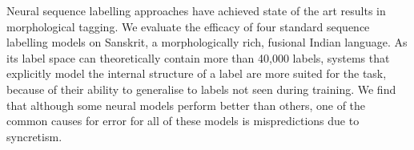 Neural sequence labelling approaches have achieved state of the art results in morphological tagging. We evaluate the efficacy of four standard sequence labelling models on Sanskrit, a morphologically rich, fusional Indian language. As its label space can theoretically contain more than 40,000 labels, systems that explicitly model the internal structure of a label are more suited for the task, because of their ability to generalise to labels not seen during training. We find that although some neural models perform better than others, one of the common causes for error for all of these models is mispredictions due to syncretism.
